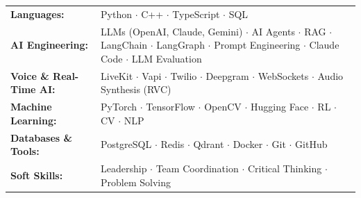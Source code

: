 \begin{tabularx}{\textwidth}{l@{\hspace{0.5cm}} X}
  \textbf{Languages:} & Python $\cdot$ C++ $\cdot$ TypeScript $\cdot$ SQL \\
  \textbf{AI Engineering:} & LLMs (OpenAI, Claude, Gemini) $\cdot$ AI Agents $\cdot$ RAG $\cdot$ LangChain $\cdot$ LangGraph $\cdot$ Prompt Engineering $\cdot$ Claude Code $\cdot$ LLM Evaluation \\
  \textbf{Voice \& Real-Time AI:} & LiveKit $\cdot$ Vapi $\cdot$ Twilio $\cdot$ Deepgram $\cdot$ WebSockets $\cdot$ Audio Synthesis (RVC) \\
  \textbf{Machine Learning:} & PyTorch $\cdot$ TensorFlow $\cdot$ OpenCV $\cdot$ Hugging Face $\cdot$ RL $\cdot$ CV $\cdot$ NLP \\
  \textbf{Databases \& Tools:} & PostgreSQL $\cdot$ Redis $\cdot$ Qdrant $\cdot$ Docker $\cdot$ Git $\cdot$ GitHub \\
  \textbf{Soft Skills:} & Leadership $\cdot$ Team Coordination $\cdot$ Critical Thinking $\cdot$ Problem Solving \\
\end{tabularx}
